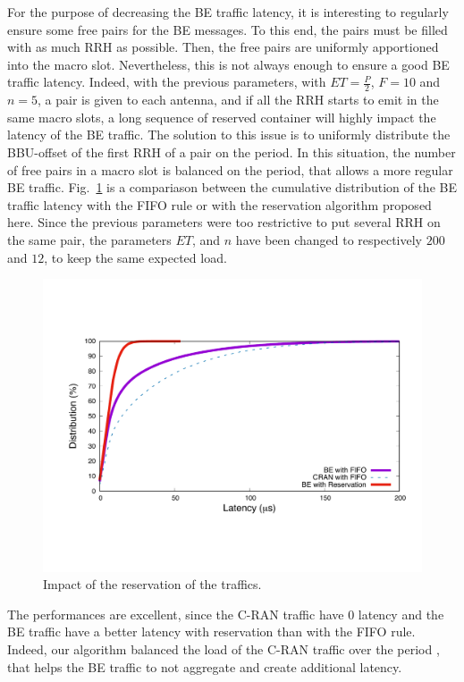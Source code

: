 \documentclass[]{algotel}
\begin{document}
For the purpose of decreasing the BE traffic latency, it is interesting to regularly ensure some free pairs for the BE messages. To this end, the pairs must be filled with as much RRH as possible. Then, the free pairs are uniformly apportioned into the macro slot. Nevertheless, this is not always enough to ensure a good BE traffic latency. Indeed, with the previous parameters, with $ET = \frac{P}{2}$, $F = 10$ and $n = 5$, a pair is given to each antenna, and if all the RRH starts to emit in the same macro slots, a long sequence of reserved container will highly impact the latency of the BE traffic. The solution to this issue is to uniformly distribute the BBU-offset of the first RRH of a pair on the period. In this situation, the number of free pairs in a macro slot is balanced on the period, that allows a more regular BE traffic. Fig.~\ref{fig:optimres} is a compariason between the cumulative distribution of the BE traffic latency with the FIFO rule or with the reservation algorithm proposed here. Since the previous parameters were too restrictive to put several RRH on the same pair, the parameters $ET$, and $n$ have been changed to respectively $200$ and $12$, to keep the same expected load.
   \begin{figure}[h]
\centering
      \includegraphics[scale=0.3]{optim.pdf}
     \caption{Impact of the reservation of the traffics.}   \label{fig:optimres}
  \end{figure}
  The performances are excellent, since the C-RAN traffic have $0$ latency and the BE traffic have a better latency with reservation than with the FIFO rule. Indeed, our algorithm balanced the load of the C-RAN traffic over the period , that helps the BE traffic to not aggregate and create additional latency.
  
\end{document}
